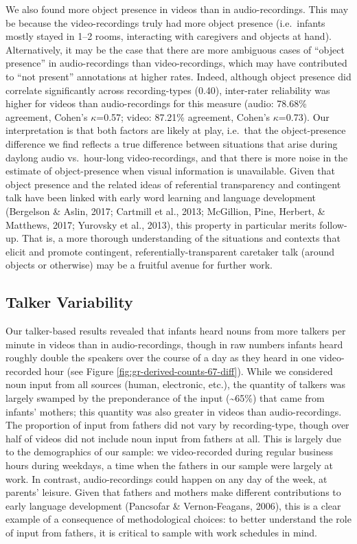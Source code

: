 \documentclass[man]{apa6}
\theoremstyle{definition}
\theoremstyle{definition}
\theoremstyle{definition}
\theoremstyle{remark}
\begin{document}
We also found more object presence in videos than in audio-recordings.
This may be because the video-recordings truly had more object presence
(i.e.~infants mostly stayed in 1--2 rooms, interacting with caregivers
and objects at hand). Alternatively, it may be the case that there are
more ambiguous cases of \enquote{object presence} in audio-recordings
than video-recordings, which may have contributed to \enquote{not
present} annotations at higher rates. Indeed, although object presence
did correlate significantly across recording-types (0.40), inter-rater
reliability was higher for videos than audio-recordings for this measure
(audio: 78.68\% agreement, Cohen's \(\kappa\)=0.57; video: 87.21\%
agreement, Cohen's \(\kappa\)=0.73). Our interpretation is that both
factors are likely at play, i.e.~that the object-presence difference we
find reflects a true difference between situations that arise during
daylong audio vs.~hour-long video-recordings, and that there is more
noise in the estimate of object-presence when visual information is
unavailable. Given that object presence and the related ideas of
referential transparency and contingent talk have been linked with early
word learning and language development (Bergelson \& Aslin, 2017;
Cartmill et al., 2013; McGillion, Pine, Herbert, \& Matthews, 2017;
Yurovsky et al., 2013), this property in particular merits follow-up.
That is, a more thorough understanding of the situations and contexts
that elicit and promote contingent, referentially-transparent caretaker
talk (around objects or otherwise) may be a fruitful avenue for further
work.

\subsection{Talker Variability}\label{talker-variability}

Our talker-based results revealed that infants heard nouns from more
talkers per minute in videos than in audio-recordings, though in raw
numbers infants heard roughly double the speakers over the course of a
day as they heard in one video-recorded hour (see Figure
\ref{fig:gr-derived-counts-67-diff}). While we considered noun input
from all sources (human, electronic, etc.), the quantity of talkers was
largely swamped by the preponderance of the input
(\textasciitilde{}65\%) that came from infants' mothers; this quantity
was also greater in videos than audio-recordings. The proportion of
input from fathers did not vary by recording-type, though over half of
videos did not include noun input from fathers at all. This is largely
due to the demographics of our sample: we video-recorded during regular
business hours during weekdays, a time when the fathers in our sample
were largely at work. In contrast, audio-recordings could happen on any
day of the week, at parents' leisure. Given that fathers and mothers
make different contributions to early language development (Pancsofar \&
Vernon-Feagans, 2006), this is a clear example of a consequence of
methodological choices: to better understand the role of input from
fathers, it is critical to sample with work schedules in mind.
\end{document}
